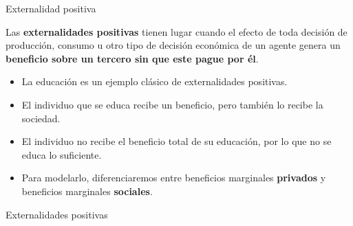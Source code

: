 \documentclass{beamer}
\begin{document}
\begin{frame}{Externalidad positiva}
    \begin{boxB}
        Las \textbf{externalidades positivas} tienen lugar cuando el efecto de toda decisión de producción, consumo u otro tipo de decisión económica de un agente genera un \textbf{beneficio sobre un tercero sin que este pague por él}.
    \end{boxB}
    \begin{itemize}
        \item La educación es un ejemplo clásico de externalidades positivas.
        \item El individuo que se educa recibe un beneficio, pero también lo recibe la sociedad.
        \item El individuo no recibe el beneficio total de su educación, por lo que no se educa lo suficiente.
        \item Para modelarlo, diferenciaremos entre beneficios marginales \textbf{privados} y beneficios marginales \textbf{sociales}.
    \end{itemize}
\end{frame}



\begin{frame}{Externalidades positivas}
\begin{figure} [H]
\centering
{}
\end{figure} 
\end{frame}
\end{document}
